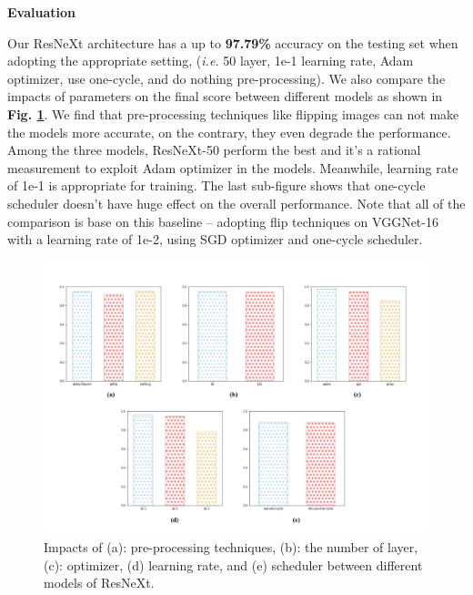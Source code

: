 \documentclass[a4paper]{article}
\begin{document}
\vspace{2mm}
\begin{center}
\large\textbf{Evaluation} \\
\end{center}
\large{
Our \textsf{ResNeXt} architecture has a up to \textbf{97.79\%} accuracy on the testing set when adopting the appropriate setting, (\textit{i.e.} 50 layer, 1e-1 learning rate, Adam optimizer, use one-cycle, and do nothing pre-processing). We also compare the impacts of parameters on the final score between different models as shown in \textbf{Fig. \ref{resxcompare}}. We find that pre-processing techniques like flipping images can not make the models more accurate, on the contrary, they even degrade the performance. Among the three models, \textsf{ResNeXt-50} perform the best and it's a rational measurement to exploit Adam optimizer in the models. Meanwhile, learning rate of 1e-1 is appropriate for training. The last sub-figure shows that one-cycle scheduler doesn't have huge effect on the overall performance. Note that all of the comparison is base on this baseline -- adopting flip techniques on \textsf{VGGNet-16} with a learning rate of 1e-2, using SGD optimizer and one-cycle scheduler.

\begin{figure}[h]
\centering
\includegraphics[width=15cm]{resX.pdf}
\caption{ Impacts of (a): pre-processing techniques, (b): the number of layer, (c): optimizer, (d) learning rate, and (e) scheduler between different models of \textsf{ResNeXt}.}
\label{resxcompare}
\end{figure}

}
\end{document}
